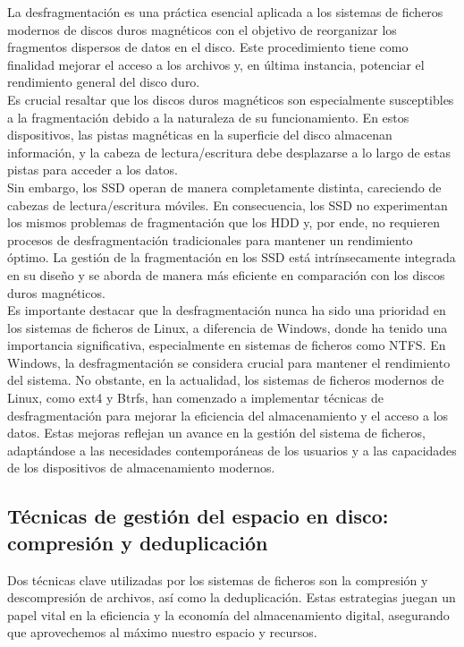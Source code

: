 La desfragmentación es una práctica esencial aplicada a los sistemas de ficheros modernos de discos duros magnéticos con el objetivo de reorganizar los fragmentos dispersos de datos en el disco. Este procedimiento tiene como finalidad mejorar el acceso a los archivos y, en última instancia, potenciar el rendimiento general del disco duro.\\

Es crucial resaltar que los discos duros magnéticos son especialmente susceptibles a la fragmentación debido a la naturaleza de su funcionamiento. En estos dispositivos, las pistas magnéticas en la superficie del disco almacenan información, y la cabeza de lectura/escritura debe desplazarse a lo largo de estas pistas para acceder a los datos.\\

Sin embargo, los SSD operan de manera completamente distinta, careciendo de cabezas de lectura/escritura móviles. En consecuencia, los SSD no experimentan los mismos problemas de fragmentación que los HDD y, por ende, no requieren procesos de desfragmentación tradicionales para mantener un rendimiento óptimo. La gestión de la fragmentación en los SSD está intrínsecamente integrada en su diseño y se aborda de manera más eficiente en comparación con los discos duros magnéticos.\\

Es importante destacar que la desfragmentación nunca ha sido una prioridad en los sistemas de ficheros de Linux, a diferencia de Windows, donde ha tenido una importancia significativa, especialmente en sistemas de ficheros como NTFS. En Windows, la desfragmentación se considera crucial para mantener el rendimiento del sistema. No obstante, en la actualidad, los sistemas de ficheros modernos de Linux, como ext4 y Btrfs, han comenzado a implementar técnicas de desfragmentación para mejorar la eficiencia del almacenamiento y el acceso a los datos. Estas mejoras reflejan un avance en la gestión del sistema de ficheros, adaptándose a las necesidades contemporáneas de los usuarios y a las capacidades de los dispositivos de almacenamiento modernos.

\subsection{Técnicas de gestión del espacio en disco: compresión y deduplicación}

Dos técnicas clave utilizadas por los sistemas de ficheros son la compresión y descompresión de archivos, así como la deduplicación. Estas estrategias juegan un papel vital en la eficiencia y la economía del almacenamiento digital, asegurando que aprovechemos al máximo nuestro espacio y recursos.

